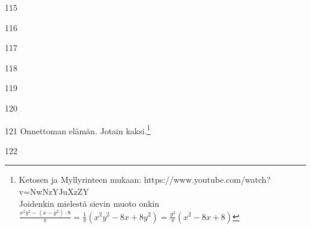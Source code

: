 \begin{Vastaus}{115}
        
\end{Vastaus}
\begin{Vastaus}{116}
        
\end{Vastaus}
\begin{Vastaus}{117}
        
\end{Vastaus}
\begin{Vastaus}{118}
        
\end{Vastaus}
\begin{Vastaus}{119}
        
\end{Vastaus}
\begin{Vastaus}{120}
        
\end{Vastaus}
\begin{Vastaus}{121}
    	Onnettoman elämän. Jotain kaksi.\footnote{Ketosen ja Myllyrinteen mukaan: https://www.youtube.com/watch?v=NwNzYJuXzZY \\ Joidenkin mielestä sievin muoto onkin $\frac{x^2y^2-(x-y^2)\cdot 8}{\pi}=\frac{1}{\pi}(x^2y^2-8x+8y^2)=\frac{y^2}{\pi}(x^2-8x+8)$}
    	
\end{Vastaus}
\begin{Vastaus}{122}
	
\end{Vastaus}
